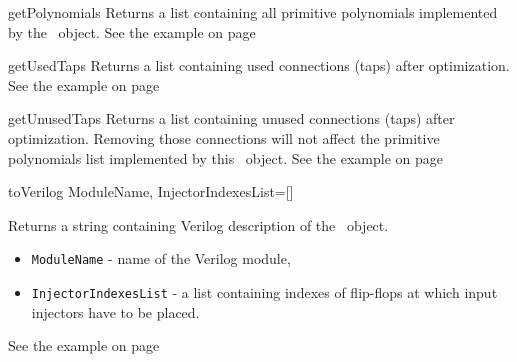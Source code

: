 {getPolynomials} {} {
	Returns a list containing all primitive polynomials implemented by the \ProgrammableLfsr\ object.
	See the example on page \pageref{programmablelfsrexample}
}

 {getUsedTaps} {} {
	Returns a list containing used connections (taps) after optimization. 
	See the example on page \pageref{programmablelfsrexample}
}

 {getUnusedTaps} {} {
	Returns a list containing unused connections (taps) after optimization. Removing those connections will not affect the primitive polynomials list implemented by this \ProgrammableLfsr\ object.
	See the example on page \pageref{programmablelfsrexample}
}

 {toVerilog} {ModuleName, InjectorIndexesList=[]} {
	Returns a string containing Verilog description of the \ProgrammableLfsr\ object.
	\begin{itemize}
		\item \texttt{ModuleName} - name of the Verilog module,
		\item \texttt{InjectorIndexesList} - a list containing indexes of flip-flops at which input injectors have to be placed.
	\end{itemize}
	See the example on page \pageref{programmablelfsrexample}
}


